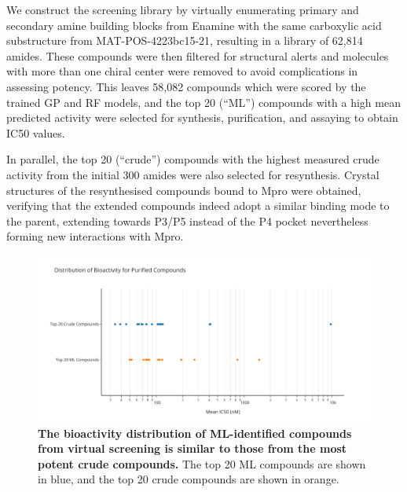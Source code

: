 We construct the screening library by virtually enumerating primary and secondary amine building blocks from Enamine with the same carboxylic acid substructure from MAT-POS-4223bc15-21, resulting in a library of 62,814 amides. These compounds were then filtered for structural alerts and molecules with more than one chiral center were removed to avoid complications in assessing potency. This leaves 58,082 compounds which were scored by the trained GP and RF models, and the top 20 (``ML'') compounds with a high mean predicted activity were selected for synthesis, purification, and assaying to obtain IC50 values.


In parallel, the top 20 (``crude'') compounds with the highest measured crude activity from the initial 300 amides were also selected for resynthesis. Crystal structures of the resynthesised compounds bound to Mpro were obtained, verifying that the extended compounds indeed adopt a similar binding mode to the parent, extending towards P3/P5 instead of the P4 pocket nevertheless forming new interactions with Mpro.

\begin{figure}[!]
 \centering
 \includegraphics[width=\textwidth]{Chapters/Crude/Figs/strip_plot.pdf}
 \caption{\textbf{The bioactivity distribution of ML-identified compounds from virtual screening is similar to those from the most potent crude compounds.} The top 20 ML compounds are shown in blue, and the top 20 crude compounds are shown in orange.}
 \label{fig:strip}
\end{figure}

